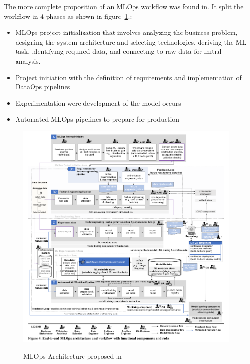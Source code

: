 The more complete proposition of an MLOps workflow was found in\cite{Kreuzberger2022MachineLO}.
It split the workflow in 4 phases as shown in figure~\ref{fig:end-to-end-workflow}.:

\begin{itemize}
    \item MLOps project initialization that involves analyzing the business problem, designing the system architecture and selecting technologies, deriving the ML task, identifying required data, and connecting to raw data for initial analysis.
    \item Project initiation with the definition of requirements and implementation of DataOps pipelines
    \item Experimentation were development of the model occurs
    \item Automated MLOps pipelines to prepare for production
\end{itemize}

\begin{figure}[!htbp]
    \caption{MLOps Architecture proposed in \cite{Kreuzberger2022MachineLO}}
    \centering
    \includegraphics[scale=0.5]{images/kreuz-end-to-end-workflow}
    \label{fig:end-to-end-workflow}
\end{figure}

